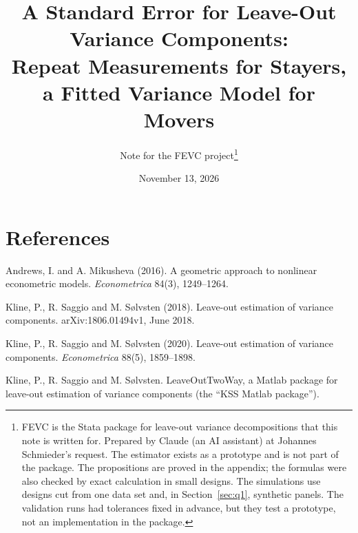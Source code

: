 \documentclass[11pt]{article}
\title{A Standard Error for Leave-Out Variance Components:\\ Repeat Measurements for Stayers, a Fitted Variance Model for Movers}
\author{Note for the FEVC project\thanks{FEVC is the Stata package for leave-out variance decompositions that
this note is written for. Prepared by Claude (an AI assistant) at Johannes Schmieder's request. The estimator
exists as a prototype and is not part of the package. The propositions are proved in the appendix; the formulas
were also checked by exact calculation in small designs. The simulations use designs cut from one data set and, in Section~\ref{sec:q1}, synthetic panels. The
validation runs had tolerances fixed in advance, but they test a prototype, not an implementation in the
package.}}
\date{November 13, 2026}
\begin{document}
\maketitle











\appendix
{\small

}



\section*{References}
Andrews, I. and A. Mikusheva (2016). A geometric approach to nonlinear econometric models. \emph{Econometrica}
84(3), 1249--1264.

\noindent Kline, P., R. Saggio and M. S{\o}lvsten (2018). Leave-out estimation of variance components. arXiv:1806.01494v1,
June 2018.

\noindent Kline, P., R. Saggio and M. S{\o}lvsten (2020). Leave-out estimation of variance components.
\emph{Econometrica} 88(5), 1859--1898.

\noindent Kline, P., R. Saggio and M. S{\o}lvsten. LeaveOutTwoWay, a Matlab package for leave-out estimation of
variance components (the ``KSS Matlab package'').
\end{document}
